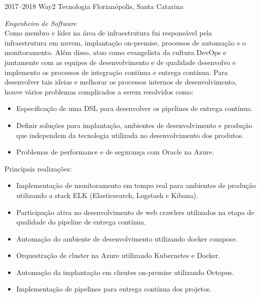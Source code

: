 \documentclass[]{friggeri-cv} %
\begin{document}
\begin{entrylist}
\entry
{2017--2018}
{Way2 Tecnologia}
{Florianópolis, Santa Catarina}
{\emph{Engenheiro de Software} \\

    Como membro e líder na área de infraestrutura fui responsável pela infraestrutura em nuvem, implantação on-premise,
    processos de automação e o monitoramento. Além disso, atuo como evangelista da cultura DevOps e juntamente com as equipes de desenvolvimento e
    de qualidade desenvolvo e implemento os processos de integração contínua e entrega contínua. Para desenvolver tais ideias e melhorar os processos
    internos de desenvolvimento, houve vários problemas complicados a serem resolvidos como:

\begin{itemize}
    \item Especificação de uma DSL para desenvolver os pipelines de entrega contínua.
    \item Definir soluções para implantação, ambientes de desenvolvimento e produção que independem da tecnologia utilizada no desenvolvimento dos produtos.
    \item Problemas de performance e de segurança com Oracle na Azure.
\end{itemize}

Principais realizações:\\

\begin{itemize}
    \item Implementação de monitoramento em tempo real para ambientes de produção utilizando a stack ELK (Elasticsearch, Logstash e Kibana).
    \item Participação ativa no desenvolvimento de web crawlers utilizados na etapa de qualidade do pipeline de entrega contínua.
    \item Automação do ambiente de desenvolvimento utilizando docker compose.
    \item Orquestração de cluster na Azure utilizando Kubernetes e Docker.
    \item Automação da implantação em clientes on-premise utilizando Octopus.
    \item Implementação de pipelines para entrega contínua dos projetos.
\end{itemize}

}
\end{entrylist}
\end{document}
